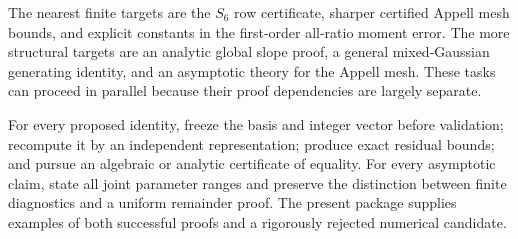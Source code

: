 The nearest finite targets are the $S_6$ row certificate, sharper
certified Appell mesh bounds, and explicit constants in the first-order
all-ratio moment error. The more structural targets are an analytic
global slope proof, a general mixed-Gaussian generating identity, and
an asymptotic theory for the Appell mesh. These tasks can proceed in
parallel because their proof dependencies are largely separate.

For every proposed identity, freeze the basis and integer vector before
validation; recompute it by an independent representation; produce exact
residual bounds; and pursue an algebraic or analytic certificate of
equality. For every asymptotic claim, state all joint parameter ranges
and preserve the distinction between finite diagnostics and a uniform
remainder proof. The present package supplies examples of both successful
proofs and a rigorously rejected numerical candidate.
